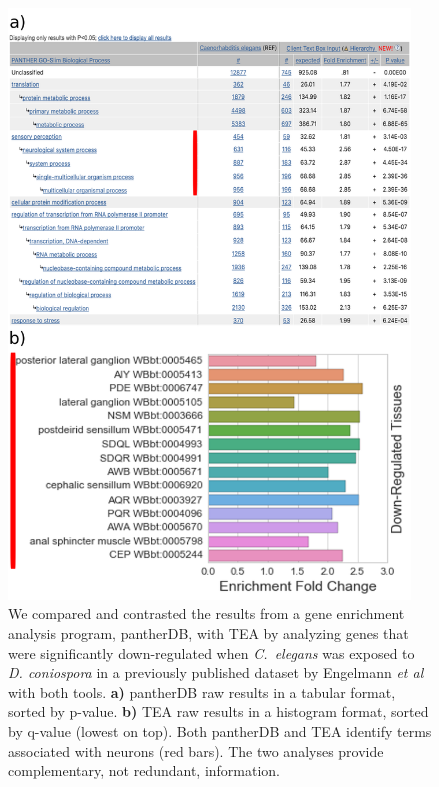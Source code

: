 \documentclass{bmcart}
\begin{document}
\begin{backmatter}
\begin{figure}[h!]
    \includegraphics[width=0.95\textwidth]{figures/EngelmannGO-TEA.png}
	\captionsetup{width= 0.95\textwidth}
  	\caption{
	We compared and contrasted the results from a gene enrichment analysis program, pantherDB, with TEA by analyzing genes that were significantly down-regulated when \emph{C.~elegans} was exposed to \emph{D. coniospora} in a previously published dataset by Engelmann \emph{et al}~\cite{Engelmann2011} with both tools. 
	\textbf{a)} pantherDB raw results in a tabular format, sorted by p-value. 
	\textbf{b)} TEA raw results in a histogram format, sorted by q-value (lowest on top). 
	Both pantherDB and TEA identify terms associated with neurons (red bars). The two analyses provide complementary, not redundant, information.}
	\label{fig:Dcon}
\end{figure}


\end{backmatter}
\end{document}
